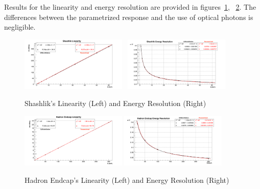  Results for the linearity and energy resolution are provided in figures~\ref{fig:simulations_shashlik_linearityresolution}, ~\ref{fig:simulations_he_linearityresolution}. The differences between the parametrized response and the use of optical photons is negligible.
 \begin{figure}[!h]
    \centering
    \includegraphics[width=0.45\textwidth]{figures/ch_simulations/shashlik/performance/ResponseVsEnergy.png}~
    \includegraphics[width=0.45\textwidth]{figures/ch_simulations/shashlik/performance/energyResolution.png}
    \caption{Shashlik's Linearity (Left) and Energy Resolution (Right)}
    \label{fig:simulations_shashlik_linearityresolution}
 \end{figure}
 \begin{figure}[!h]
    \centering
    \includegraphics[width=0.45\textwidth]{figures/ch_simulations/he/performance/Linearity.png}
    \includegraphics[width=0.45\textwidth]{figures/ch_simulations/he/performance/Resolution.png}
    \caption{Hadron Endcap's Linearity (Left) and Energy Resolution (Right)}
    \label{fig:simulations_he_linearityresolution}
 \end{figure}